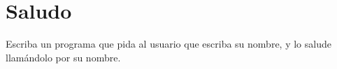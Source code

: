 \section{Saludo}

Escriba un programa que pida al usuario que escriba su nombre, y lo
salude llamándolo por su nombre.
